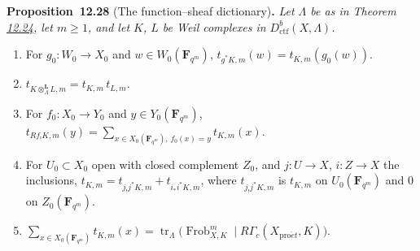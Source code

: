 \documentclass[11pt]{article}
\newenvironment{bpstatement}[2]{\par\addvspace{0.6\baselineskip}\noindent\textbf{#1}#2\textbf{.}\enspace\ignorespaces}
  {\par\addvspace{0.4\baselineskip}}
\newenvironment{bpstatementit}[2]{\begin{bpstatement}{#1}{#2}\itshape\ignorespaces}{\end{bpstatement}}
\begin{document}
\label{bp84}%
\begin{bpstatementit}{Proposition~12.28}{ (The function–sheaf dictionary)}
Let \(\Lambda\) be as in Theorem \hyperref[bp73]{12.24}, let \(m\geq1\), and let \(K\), \(L\) be Weil complexes in \(D^b_{\mathrm{ctf}}(X,\Lambda)\).

\begin{enumerate}
\item For \(g_0:W_0\to X_0\) and \(w\in W_0(\mathbf F_{q^m})\), \(t_{g^*K,m}(w)=t_{K,m}(g_0(w))\).
\item \(t_{K\otimes^{\mathbf L}_\Lambda L,m}=t_{K,m}\,t_{L,m}\).
\item For \(f_0:X_0\to Y_0\) and \(y\in Y_0(\mathbf F_{q^m})\), \(t_{Rf_!K,m}(y)=\sum_{x\in X_0(\mathbf F_{q^m}),\,f_0(x)=y}t_{K,m}(x)\).
\item For \(U_0\subset X_0\) open with closed complement \(Z_0\), and \(j:U\to X\), \(i:Z\to X\) the inclusions, \(t_{K,m}=t_{j_!j^*K,m}+t_{i_*i^*K,m}\), where \(t_{j_!j^*K,m}\) is \(t_{K,m}\) on \(U_0(\mathbf F_{q^m})\) and \(0\) on \(Z_0(\mathbf F_{q^m})\).
\item \(\sum_{x\in X_0(\mathbf F_{q^m})}t_{K,m}(x)
  =\operatorname{tr}_\Lambda\bigl(\operatorname{Frob}_{X,K}^m\mid
  R\Gamma_c(X_{\mathrm{pro}\acute{e}t},K)\bigr)\).
\end{enumerate}
\end{bpstatementit}
\end{document}
